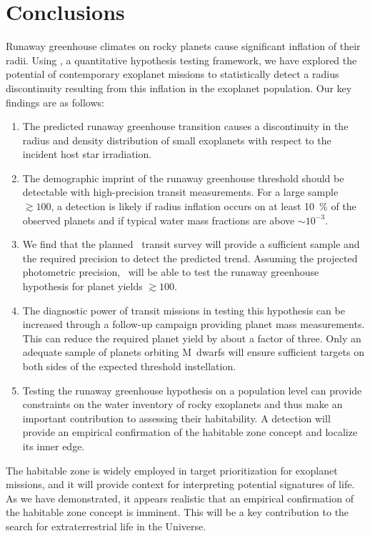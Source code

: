 \documentclass[twocolumn,twocolappendix]{aastex631}
\begin{document}
\section{Conclusions}\label{sec:conclusions}
Runaway greenhouse climates on rocky planets cause significant inflation of their radii.
Using \bioverse, a quantitative hypothesis testing framework, we have explored the potential of contemporary exoplanet missions to statistically detect a radius discontinuity resulting from this inflation in the exoplanet population.
Our key findings are as follows:
\begin{enumerate}
    \item The predicted runaway greenhouse transition causes a discontinuity in the radius and density distribution of small exoplanets with respect to the incident host star irradiation.
    \item The demographic imprint of the runaway greenhouse threshold should be detectable with high-precision transit measurements. For a large sample $\gtrsim 100$, a detection is likely if radius inflation occurs on at least \SI{10}{\percent} of the observed planets and if typical water mass fractions are above $\sim 10^{-3}$.
    \item We find that the planned \plato\ transit survey will provide a sufficient sample and the required precision to detect the predicted trend. Assuming the projected photometric precision, \plato\ will be able to test the runaway greenhouse hypothesis for planet yields $\gtrsim 100$.
    \item The diagnostic power of transit missions in testing this hypothesis can be increased through a follow-up campaign providing planet mass measurements.
          This can reduce the required planet yield by about a factor of three.
          Only an adequate sample of planets orbiting M~dwarfs will ensure sufficient targets on both sides of the expected threshold instellation.
    \item Testing the runaway greenhouse hypothesis on a population level can provide constraints on the water inventory of rocky exoplanets and thus make an important contribution to assessing their habitability.
         A detection will provide an empirical confirmation of the habitable zone concept and localize its inner edge.

\end{enumerate}

The habitable zone is widely employed in target prioritization for exoplanet missions, and it will provide context for interpreting potential signatures of life.
As we have demonstrated, it appears realistic that an empirical confirmation of the habitable zone concept is imminent.
This will be a key contribution to the search for extraterrestrial life in the Universe.
\end{document}
